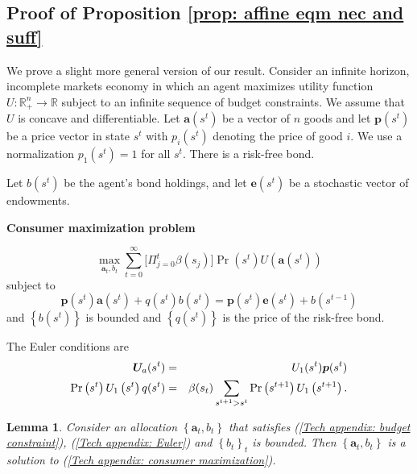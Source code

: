 \documentclass[thmsb,11pt]{article}
\newtheorem{lemma}{Lemma}
\begin{document}
\smallskip
\subsection{\smallskip Proof of Proposition  \ref{prop: affine eqm nec and suff}}
\label{appndx: affine eqm nec and stuff}
\smallskip

We prove a slight more general version of our result. Consider an infinite
horizon, incomplete markets economy in which an agent maximizes utility
function $U:\mathbb{R}_{+}^{n}\rightarrow \mathbb{R}$ subject to an infinite
sequence of budget constraints. We assume that $U$ is concave and
differentiable. Let $\bm{a}(s^t)$ be a vector of $n$ goods and let $%
\bm{p}(s^{t})$ be a price vector in state $s^{t}$ with $p_{i}(s^{t})$
denoting the price of good $i.$ We use a normalization $p_{1}\left(
s^{t}\right) =1$ for all $s^{t}.$ There is a risk-free bond.

Let $b(s^{t})$ be the agent's bond holdings, and let $\bm{e}\left(
s^{t}\right) $ be a stochastic vector of endowments.

\textbf{Consumer maximization problem}


\begin{equation}
\max_{\bm{a}_{t},b_{t}}\sum_{t=0}^{\infty }\bigl[\Pi_{j=0}^t \beta(s_j)\bigr]\Pr \left(
s^{t}\right) U(\bm{a}\left( s^{t}\right) )
\label{Tech appendix: consumer maximization}
\end{equation}%
subject to%
\begin{equation}
\bm{p}\left( s^{t}\right) \bm{a}\left( s^{t}\right) +q(s^{t})b\left(
s^{t}\right) =\bm{p}\left( s^{t}\right) \bm{e}\left( s^{t}\right)
+b\left( s^{t-1}\right)  \label{Tech appendix: budget constraint}
\end{equation}%
and $\left \{ b\left( s^{t}\right) \right \} $ is bounded and $\left \{
q(s^{t})\right \} $ is the price of the risk-free bond.

The Euler conditions are%
\begin{eqnarray}
\bm{U}_{a}(s^{t}) &=&U_{1}(s^{t})\bm{p}(s^{t})
\label{Tech appendix: Euler} \\
\Pr \left( s^{t}\right) U_{1}\left( s^{t}\right) q(s^{t}) &=&\beta(s_t)
\sum_{s^{t+1}>s^{t}}\Pr \left( s^{t+1}\right) U_{1}\left( s^{t+1}\right) .
\notag
\end{eqnarray}

\begin{lemma}
\smallskip Consider an allocation $\left \{ \bm{a}_{t},b_{t}\right \} $
that satisfies (\ref{Tech appendix: budget constraint}), (\ref{Tech
appendix: Euler}) and $\left \{ b_{t}\right \} _{t}$ is bounded. Then $%
\left
\{ \bm{a}_{t},b_{t}\right \} $ is a solution to (\ref{Tech
appendix: consumer maximization}).
\end{lemma}
\end{document}
